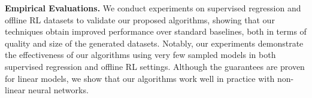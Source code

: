 {\bf Empirical Evaluations.} We conduct experiments on supervised regression and offline RL datasets to validate our proposed algorithms, showing that our techniques obtain improved performance over standard baselines, both in terms of quality and size of the generated datasets. Notably, our experiments demonstrate the effectiveness of our algorithms using very few sampled models in both supervised regression and offline RL settings. Although the guarantees are proven for linear models, we show that our algorithms work well in practice with non-linear neural networks.





